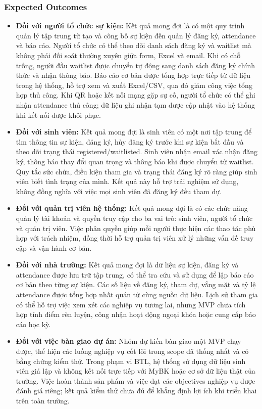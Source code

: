 \subsubsection{Expected Outcomes}

\begin{itemize}
\item \textbf{Đối với người tổ chức sự kiện:} Kết quả mong đợi là có một quy trình quản lý tập trung từ tạo và công bố sự kiện đến quản lý đăng ký, attendance và báo cáo. Người tổ chức có thể theo dõi danh sách đăng ký và waitlist mà không phải đối soát thường xuyên giữa form, Excel và email. Khi có chỗ trống, người đầu waitlist được chuyển tự động sang danh sách đăng ký chính thức và nhận thông báo. Báo cáo cơ bản được tổng hợp trực tiếp từ dữ liệu trong hệ thống, hỗ trợ xem và xuất Excel/CSV, qua đó giảm công việc tổng hợp thủ công. Khi QR hoặc kết nối mạng gặp sự cố, người tổ chức có thể ghi nhận attendance thủ công; dữ liệu ghi nhận tạm được cập nhật vào hệ thống khi kết nối được khôi phục.

\item \textbf{Đối với sinh viên:} Kết quả mong đợi là sinh viên có một nơi tập trung để tìm thông tin sự kiện, đăng ký, hủy đăng ký trước khi sự kiện bắt đầu và theo dõi trạng thái registered/waitlisted. Sinh viên nhận email xác nhận đăng ký, thông báo thay đổi quan trọng và thông báo khi được chuyển từ waitlist. Quy tắc sức chứa, điều kiện tham gia và trạng thái đăng ký rõ ràng giúp sinh viên biết tình trạng của mình. Kết quả này hỗ trợ trải nghiệm sử dụng, không đồng nghĩa với việc mọi sinh viên đã đăng ký đều tham dự.

\item \textbf{Đối với quản trị viên hệ thống:} Kết quả mong đợi là có các chức năng quản lý tài khoản và quyền truy cập cho ba vai trò: sinh viên, người tổ chức và quản trị viên. Việc phân quyền giúp mỗi người thực hiện các thao tác phù hợp với trách nhiệm, đồng thời hỗ trợ quản trị viên xử lý những vấn đề truy cập và vận hành cơ bản.

\item \textbf{Đối với nhà trường:} Kết quả mong đợi là dữ liệu sự kiện, đăng ký và attendance được lưu trữ tập trung, có thể tra cứu và sử dụng để lập báo cáo cơ bản theo từng sự kiện. Các số liệu về đăng ký, tham dự, vắng mặt và tỷ lệ attendance được tổng hợp nhất quán từ cùng nguồn dữ liệu. Lịch sử tham gia có thể hỗ trợ việc xem xét các nghiệp vụ tương lai, nhưng MVP chưa tích hợp tính điểm rèn luyện, công nhận hoạt động ngoại khóa hoặc cung cấp báo cáo học kỳ.

\item \textbf{Đối với việc bàn giao dự án:} Nhóm dự kiến bàn giao một MVP chạy được, thể hiện các luồng nghiệp vụ cốt lõi trong scope đã thống nhất và có bằng chứng kiểm thử. Trong phạm vi BTL, hệ thống sử dụng dữ liệu sinh viên giả lập và không kết nối trực tiếp với MyBK hoặc cơ sở dữ liệu thật của trường. Việc hoàn thành sản phẩm và việc đạt các objectives nghiệp vụ được đánh giá riêng; kết quả kiểm thử chưa đủ để khẳng định lợi ích khi triển khai trên toàn trường.
\end{itemize}

